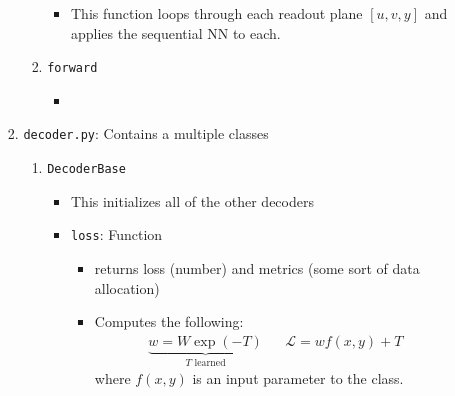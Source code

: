 \begin{itemize}
\begin{enumerate}
\begin{enumerate}
\begin{enumerate}
\begin{itemize}
                                \item This function loops through each readout plane $[u, v, y]$ and applies the sequential NN to each.
                            \end{itemize}
                            
                            \item \texttt{forward}
                            \begin{itemize}
                                \item 
                            \end{itemize}

                        \end{enumerate}

                    \item \texttt{decoder.py}: Contains a multiple classes
                        \begin{enumerate}
                            \item \texttt{DecoderBase}
                                \begin{itemize}
                                    \item This initializes all of the other decoders
                                    \item \texttt{loss}: Function
                                        \begin{itemize}
                                            \item returns loss (number) and metrics (some sort of data allocation)
                                            \item Computes the following:
                                            \begin{equation}
                                                \begin{aligned}
                                                    \underbrace{w = W\exp(-T)}_{T \text{ learned}} && \mathcal{L} = wf(x, y) + T
                                                \end{aligned}
                                            \end{equation}
                                            where $f(x, y)$ is an input parameter to the class.

                                        \end{itemize}
                                \end{itemize}


\end{enumerate}
\end{enumerate}
\end{enumerate}
\end{itemize}
